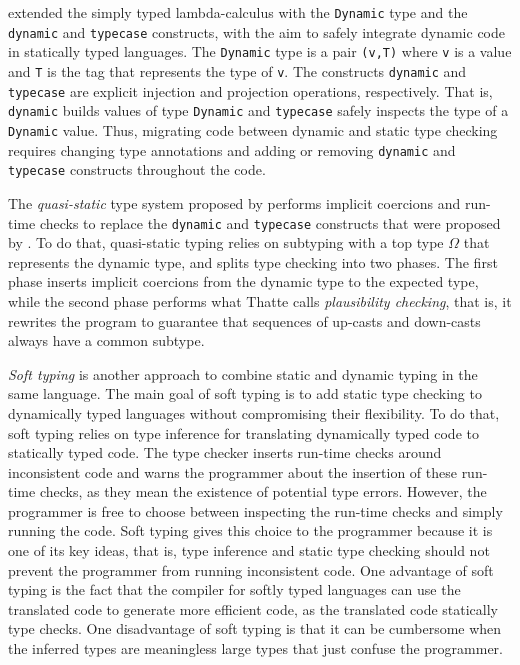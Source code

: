 \documentclass[preprint]{sig-alternate}
\begin{document}
\cite{abadi1989dts} extended the simply typed lambda-calculus with the
\verb'Dynamic' type and the \verb'dynamic' and \verb'typecase'
constructs, with the aim to safely integrate dynamic code in
statically typed languages.
The \verb'Dynamic' type is a pair \verb'(v,T)' where \verb'v' is a
value and \verb'T' is the tag that represents the type of \verb'v'.
The constructs \verb'dynamic' and \verb'typecase' are explicit
injection and projection operations, respectively.
That is, \verb'dynamic' builds values of type \verb'Dynamic' and
\verb'typecase' safely inspects the type of a \verb'Dynamic' value.
Thus, migrating code between dynamic and static type checking requires
changing type annotations and adding or removing \verb'dynamic' and
\verb'typecase' constructs throughout the code.

The \textit{quasi-static} type system proposed by \cite{thatte1990qst}
performs implicit coercions and run-time checks to replace the
\verb'dynamic' and \verb'typecase' constructs that were proposed by
\cite{abadi1989dts}.
To do that, quasi-static typing relies on subtyping with a top type
$\Omega$ that represents the dynamic type, and splits type checking
into two phases.
The first phase inserts implicit coercions from the dynamic type to
the expected type, while the second phase performs what Thatte calls
\textit{plausibility checking}, that is, it rewrites the program to
guarantee that sequences of up-casts and down-casts always have a
common subtype.

\textit{Soft typing} \cite{cartwright1991soft} is another approach
to combine static and dynamic typing in the same language.
The main goal of soft typing is to add static type checking to
dynamically typed languages without compromising their flexibility.
To do that, soft typing relies on type inference for
translating dynamically typed code to statically typed code.
The type checker inserts run-time checks around inconsistent code and
warns the programmer about the insertion of these run-time checks,
as they mean the existence of potential type errors.
However, the programmer is free to choose between inspecting the
run-time checks and simply running the code.
Soft typing gives this choice to the programmer because it is one of
its key ideas, that is, type inference and static type checking should
not prevent the programmer from running inconsistent code.
One advantage of soft typing is the fact that the compiler for
softly typed languages can use the translated code to generate
more efficient code, as the translated code statically type checks.
One disadvantage of soft typing is that it can be cumbersome when
the inferred types are meaningless large types that just confuse the
programmer.
\end{document}
